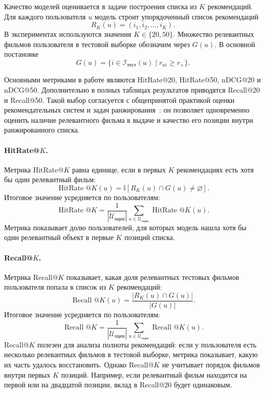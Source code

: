\documentclass[12pt,fleqn]{article}
\begin{document}
Качество моделей оценивается в задаче построения списка из $K$ рекомендаций. Для каждого пользователя $u$ модель строит упорядоченный список рекомендаций
$$
    R_K(u)=(i_1,i_2,\ldots,i_K).
$$
В экспериментах используются значения $K\in\{20,50\}$.
Множество релевантных фильмов пользователя в тестовой выборке обозначим через $G(u)$. В основной постановке
$$
    G(u)=
    \{i\in\mathcal{I}_{\text{тест}}(u)\mid r_{ui}\geq r_{+}\}.
$$

Основными метриками в работе являются HitRate@20, HitRate@50, nDCG@20 и nDCG@50. Дополнительно в полных таблицах результатов приводятся Recall@20 и Recall@50. Такой выбор согласуется с общепринятой практикой оценки рекомендательных систем и задач ранжирования~\cite{herlocker2004evaluating,gunawardana2009survey,steck2013evaluation}: он позволяет одновременно оценить наличие релевантного фильма в выдаче и качество его позиции внутри ранжированного списка.

\paragraph{HitRate@$K$.}

Метрика HitRate@$K$ равна единице, если в первых $K$ рекомендациях есть хотя бы
один релевантный фильм:
$$
    \operatorname{HitRate}@K(u)=
    \mathbb{I}\left[R_K(u)\cap G(u)\neq\varnothing\right].
$$
Итоговое значение усредняется по пользователям:
$$
    \operatorname{HitRate}@K=
    \frac{1}{|\mathcal{U}_{\text{оцен}}|}
    \sum_{u\in\mathcal{U}_{\text{оцен}}}
    \operatorname{HitRate}@K(u).
$$
Метрика показывает долю пользователей, для которых модель нашла хотя бы один
релевантный объект в первые $K$ позиций списка. 

\paragraph{Recall@$K$.}

Метрика Recall@$K$ показывает, какая доля релевантных тестовых фильмов пользователя попала в список из $K$ рекомендаций:
$$
    \operatorname{Recall}@K(u)=
    \frac{|R_K(u)\cap G(u)|}{|G(u)|}.
$$
Итоговое значение усредняется по пользователям:
$$
    \operatorname{Recall}@K=
    \frac{1}{|\mathcal{U}_{\text{оцен}}|}
    \sum_{u\in\mathcal{U}_{\text{оцен}}}
    \operatorname{Recall}@K(u).
$$
Recall@$K$ полезен для анализа полноты рекомендаций: если у пользователя есть несколько релевантных фильмов в тестовой выборке, метрика показывает, какую их часть удалось восстановить. Однако Recall@$K$ не учитывает порядок фильмов внутри первых $K$ позиций. Например, если релевантный фильм находится на первой или на двадцатой позиции, вклад в Recall@20 будет одинаковым.
\end{document}
